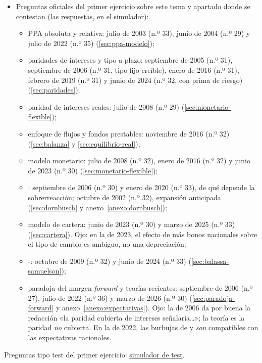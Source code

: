 \documentclass[11pt]{article}
\begin{document}
\begin{itemize}
\item Preguntas oficiales del primer ejercicio sobre este tema y apartado donde se contestan (las respuestas, en el simulador):
  \begin{itemize}
  \item PPA absoluta y relativa: julio de 2003 (n.º 33), junio de 2004 (n.º 29) y julio de 2022 (n.º 35) (\ref{sec:ppa-modelo});
  \item paridades de intereses y tipo a plazo: septiembre de 2005 (n.º 31), septiembre de 2006 (n.º 31, tipo fijo creíble), enero de 2016 (n.º 31), febrero de 2019 (n.º 31) y junio de 2024 (n.º 32, con prima de riesgo) (\ref{sec:paridades});
  \item paridad de intereses reales: julio de 2008 (n.º 29) (\ref{sec:monetario-flexible});
  \item enfoque de flujos y fondos prestables: noviembre de 2016 (n.º 32) (\ref{sec:balanza} y \ref{sec:equilibrio-real});
  \item modelo monetario: julio de 2008 (n.º 32), enero de 2016 (n.º 32) y junio de 2023 (n.º 30) (\ref{sec:monetario-flexible});
  \item {}: septiembre de 2006 (n.º 30) y enero de 2020 (n.º 33), de qué depende la sobrerreacción; octubre de 2002 (n.º 32), expansión anticipada (\ref{sec:dornbusch} y anexo~\ref{anexo:dornbusch});
  \item modelo de cartera: junio de 2023 (n.º 30) y marzo de 2025 (n.º 33) (\ref{sec:cartera}). Ojo: en la de 2023, el efecto de más bonos nacionales sobre el tipo de cambio es ambiguo, no una depreciación;
  \item {}-: octubre de 2009 (n.º 32) y junio de 2024 (n.º 33) (\ref{sec:balassa-samuelson});
  \item paradoja del margen \emph{forward} y teorías recientes: septiembre de 2006 (n.º 27), julio de 2022 (n.º 36) y marzo de 2026 (n.º 30) (\ref{sec:paradoja-forward} y anexo~\ref{anexo:expectativas}). Ojo: la de 2006 da por buena la redacción «la paridad cubierta de intereses señalaría…»; la teoría es la paridad \emph{no} cubierta. En la de 2022, las burbujas de  y  \emph{son} compatibles con las expectativas racionales.
  \end{itemize}
\end{itemize}

\begin{anotaciones}
Preguntas tipo test del primer ejercicio: \href{https://www.victorgutierrezmarcos.es/oposicion/temario/primer-ejercicio/test/simulador.html?tema=3.B.14}{simulador de test}.
\end{anotaciones}

\bibliografia
\end{document}
